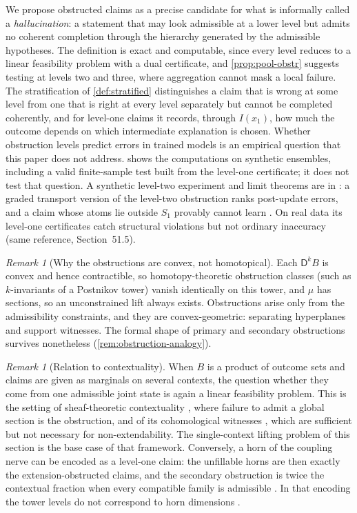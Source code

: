 \documentclass[11pt]{article}
\theoremstyle{definition}
\theoremstyle{remark}
\newtheorem{remark}[theorem]{Remark}
\newcommand{\D}{\mathsf{D}}
\begin{document}
We propose obstructed claims as a precise candidate for what is informally called a
\emph{hallucination}: a statement that may look admissible at a lower level but admits no coherent
completion through the hierarchy generated by the admissible hypotheses. The definition is exact
and computable, since every level reduces to a linear feasibility problem with a dual certificate,
and \cref{prop:pool-obstr} suggests testing at levels two and three, where aggregation cannot mask a
local failure. The stratification of \cref{def:stratified} distinguishes a claim that is wrong at some
level from one that is right at every level separately but cannot be completed coherently, and for
level-one claims it records, through $I(x_1)$, how much the outcome depends on which intermediate
explanation is chosen. Whether obstruction levels predict errors in trained models is an empirical question that
this paper does not address.  shows the computations on synthetic ensembles, including a valid
finite-sample test built from the level-one certificate; it does not test that question. A synthetic level-two
experiment and limit theorems are in \cite[Sections~51.5 and~52]{Awasthi-ThreeLayers}: a graded transport version of the
level-two obstruction ranks post-update errors, and a claim whose atoms lie outside $S_1$ provably cannot learn
\cite[Lemma~52.1, Thm.~52.2, Cor.~52.3]{Awasthi-ThreeLayers}. On real data its level-one certificates catch structural
violations but not ordinary inaccuracy (same reference, Section~51.5).

\begin{remark}[Why the obstructions are convex, not homotopical]
Each $\D^kB$ is convex and hence contractible, so homotopy-theoretic obstruction classes (such as
$k$-invariants of a Postnikov tower) vanish identically on this tower, and $\mu$ has sections, so an
unconstrained lift always exists. Obstructions arise only from the admissibility constraints, and they
are convex-geometric: separating hyperplanes and support witnesses. The formal shape of primary and
secondary obstructions survives nonetheless (\cref{rem:obstruction-analogy}).
\end{remark}

\begin{remark}[Relation to contextuality]
When $B$ is a product of outcome sets and claims are given as marginals on several contexts, the
question whether they come from one admissible joint state is again a linear feasibility problem.
This is the setting of sheaf-theoretic contextuality \cite{AbramskyBrandenburger2011}, where failure to
admit a global section is the obstruction, and of its cohomological witnesses
\cite{AbramskyMansfieldBarbosa2012}, which are sufficient but not necessary for non-extendability. The
single-context lifting problem of this section is the base case of that framework. Conversely, a horn of the coupling
nerve can be encoded as a level-one claim: the unfillable horns are then exactly the extension-obstructed claims, and the
secondary obstruction is twice the contextual fraction when every compatible family is admissible
\cite[Thm.~11.2]{Conditionals}. In that encoding the tower levels do not correspond to horn dimensions
\cite[Cor.~11.3]{Conditionals}.
\end{remark}
\end{document}
